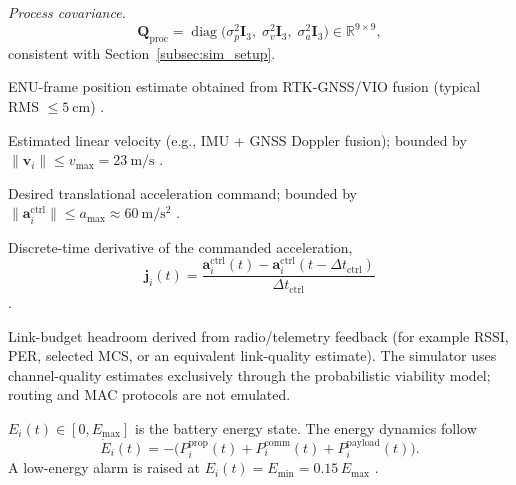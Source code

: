 \documentclass[preprint,12pt]{elsarticle}
\theoremstyle{definition}\newtheorem{definition}{Definition}
\theoremstyle{plain}\newtheorem{theorem}{Theorem}
\theoremstyle{plain}\newtheorem{lemma}{Lemma}
\theoremstyle{plain}\newtheorem{corollary}{Corollary}
\theoremstyle{plain}\newtheorem{assumption}{Assumption}
\theoremstyle{remark}\newtheorem{remark}[theorem]{Remark}
\begin{document}
\smallskip
\noindent\textit{Process covariance.}
\[
  \boldsymbol Q_{\mathrm{proc}}
  = \operatorname{diag}\!\bigl(\sigma_p^2\boldsymbol I_3,\;\sigma_v^2\boldsymbol I_3,\;\sigma_a^2\boldsymbol I_3\bigr)
  \in\mathbb{R}^{9\times 9},
\]
consistent with Section~\ref{subsec:sim_setup}.

\begin{description}[labelindent=0pt,leftmargin=0.85cm,font=\normalfont\itshape]

\item[\textbf{Position} $\boldsymbol p_i(t)\in\mathbb{R}^{3}$ (\si{\meter}):]
ENU-frame position estimate obtained from RTK-GNSS/VIO fusion (typical RMS $\le\SI{5}{\centi\meter}$) \cite{qin2018IEEE}.

\item[\textbf{Velocity} $\boldsymbol v_i(t)\in\mathbb{R}^{3}$ (\si{\meter\per\second}):]
Estimated linear velocity (e.g., IMU + GNSS Doppler fusion); bounded by $\lVert\boldsymbol v_i\rVert \le v_{\max}=\SI{23}{\meter\per\second}$ \cite{chen2008Ionospheric}.

\item[\textbf{Control acceleration} $\boldsymbol a_i^{\text{ctrl}}(t)\in\mathbb{R}^{3}$ (\si{\meter\per\square\second}):]
Desired translational acceleration command; bounded by $\lVert\boldsymbol a_i^{\text{ctrl}}\rVert \le a_{\max}\approx\SI{60}{\meter\per\square\second}$ \cite{mellinger2011IEEE}.

\item[\textbf{Jerk} $\boldsymbol j_i(t)\in\mathbb R^{3}$ (\si{\meter\per\cubic\second}):]
Discrete-time derivative of the commanded acceleration,
\[
  \boldsymbol j_i(t)=\frac{\boldsymbol a_i^{\text{ctrl}}(t)-\boldsymbol a_i^{\text{ctrl}}(t-\Delta t_{\text{ctrl}})}{\Delta t_{\text{ctrl}}}
\]
\cite{mellinger2011IEEE}.

\item[\textbf{Channel quality} $h_i^{\text{ch}}(t)\in\mathbb{R}$ (\si{\decibel}):]
Link-budget headroom derived from radio/telemetry feedback (for example RSSI, PER, selected MCS, or an equivalent link-quality estimate). The simulator uses channel-quality estimates exclusively through the probabilistic viability model; routing and MAC protocols are not emulated.

\item[\textbf{Remaining energy} $E_i(t)$ (\si{\joule}):]
$E_i(t)\in[0,E_{\max}]$ is the battery energy state.
The energy dynamics follow
\[
  \dot E_i(t)=-
  \bigl(P_i^{\text{prop}}(t)+P_i^{\text{comm}}(t)+P_i^{\text{payload}}(t)\bigr).
\]
A low-energy alarm is raised at $E_i(t)=E_{\min}=0.15\,E_{\max}$ \cite{zeng2016IEEE}.


\end{description}
\end{document}
